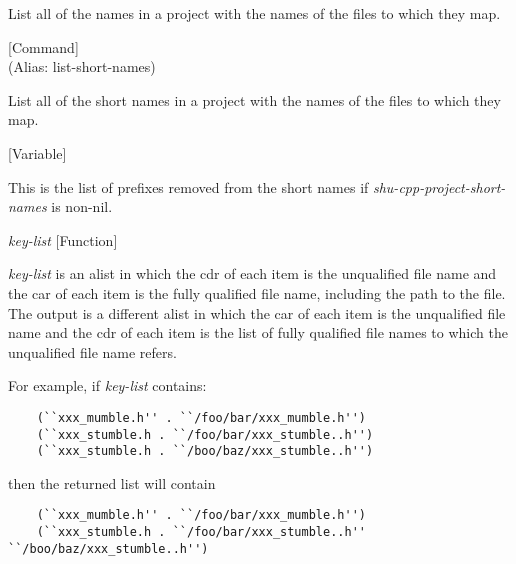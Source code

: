 \begin{doc-string}
List all of the names in a project with the names of the files to
which they map.
\end{doc-string}

\vspace{1em}
\noindent
{}
\usebox{\funcname}
 \hfill [Command]\\%
 (Alias: list-short-names)

\begin{doc-string}
List all of the short names in a project with the names of the files to
which they map.
\end{doc-string}

\vspace{1em}
\noindent
{}
\usebox{\funcname}
 \hfill [Variable]

\begin{doc-string}
This is the list of prefixes removed from the short names if
\emph{shu-cpp-project-short-names} is non-nil.
\end{doc-string}

\vspace{1em}
\noindent
{}
\usebox{\funcname}\emph{key-list}
 \hfill [Function]

\begin{doc-string}
\emph{key-list} is an alist in which the cdr of each item is the unqualified file name
and the car of each item is the fully qualified file name, including the path to
the file.  The output is a different alist in which the car of each item is the
unqualified file name and the cdr of each item is the list of fully qualified
file names to which the unqualified file name refers.

For example, if \emph{key-list} contains:

\small{\begin{verbatim}
    (``xxx_mumble.h'' . ``/foo/bar/xxx_mumble.h'')
    (``xxx_stumble.h . ``/foo/bar/xxx_stumble..h'')
    (``xxx_stumble.h . ``/boo/baz/xxx_stumble..h'')
\end{verbatim}}

then the returned list will contain

\small{\begin{verbatim}
    (``xxx_mumble.h'' . ``/foo/bar/xxx_mumble.h'')
    (``xxx_stumble.h . ``/foo/bar/xxx_stumble..h'' ``/boo/baz/xxx_stumble..h'')
\end{verbatim}}
\end{doc-string}

